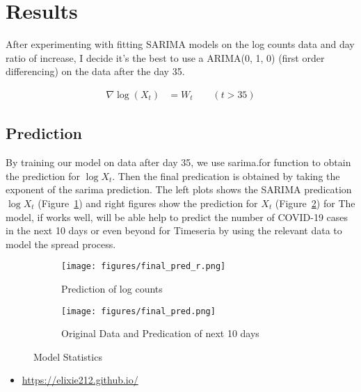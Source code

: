 \documentclass[a4paper]{article}
\begin{document}
\section{Results}\label{sec:results}
After experimenting with fitting SARIMA models on the log counts data and day
ratio of increase, I decide it's the best to use a ARIMA(0, 1, 0) (first order
differencing) on the data after the day 35.


\begin{align}
	 \nabla \log{(X_t)} &= W_t  \text{ }\text{ }\text{ }  (t>35)
	\label{eq:first_arma_model}
\end{align}


\subsection{Prediction}
By training our model on data after day 35, we use sarima.for function to obtain
the prediction for $\log{X_t}$. Then the final predication is obtained by taking
the exponent of the sarima prediction. The left plots shows the SARIMA
predication $\log{X_t}$ (Figure~\ref{pred:r}) and right figures show the
prediction for $X_t$ (Figure~\ref{pred:p}) for The model, if works well, will be
able help to predict the number of COVID-19 cases in the next 10 days or even
beyond for Timeseria by using the relevant data to model the spread process.

\begin{figure}[htpb]
\centering

\begin{subfigure}{.5\textwidth}
  \centering
  \texttt{[image: figures/final\_pred\_r.png]}
  \caption{Prediction of log counts}
  \label{pred:r}
\end{subfigure}%
\begin{subfigure}{.5\textwidth}
	\centering
	\texttt{[image: figures/final\_pred.png]}
	\caption{Original Data and Predication of next 10 days}
	\label{pred:p}
\end{subfigure}

\caption{Model Statistics}
\label{pred}
\end{figure}

\begin{itemize}
\item \url{https://elixie212.github.io/}
\end{itemize}
\end{document}
